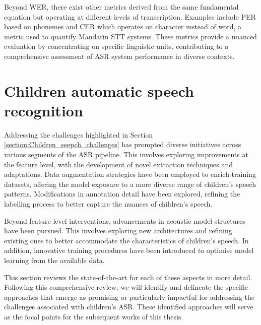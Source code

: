 Beyond \ac{WER}, there exist other metrics derived from the same fundamental equation but operating at different levels of transcription. Examples include \ac{PER}  based on phonemes and \ac{CER} which operates on character instead of word, a metric used to quantify Mandarin \ac{STT} systems. These metrics provide a nuanced evaluation by concentrating on specific linguistic units, contributing to a comprehensive assessment of \ac{ASR} system performance in diverse contexts.

\newpage
\section{Children automatic speech recognition} %
Addressing the challenges highlighted in Section \ref{section:Children_seepch_challenges} has prompted diverse initiatives across various segments of the \ac{ASR} pipeline. This involves exploring improvements at the feature level, with the development of novel extraction techniques and adaptations. Data augmentation strategies have been employed to enrich training datasets, offering the model exposure to a more diverse range of children's speech patterns.  Modifications in annotation detail have been explored, refining the labelling process to better capture the nuances of children's speech.

Beyond feature-level interventions, advancements in acoustic model structures have been pursued. This involves exploring new architectures and refining existing ones to better accommodate the characteristics of children's speech. In addition, innovative training procedures have been introduced to optimise model learning from the available data.

This section reviews the state-of-the-art for each of these aspects in more detail. Following this comprehensive review, we will identify and delineate the specific approaches that emerge as promising or particularly impactful for addressing the challenges associated with children's  \ac{ASR}. These identified approaches will serve as the focal points for the subsequent works of this thesis.
 
